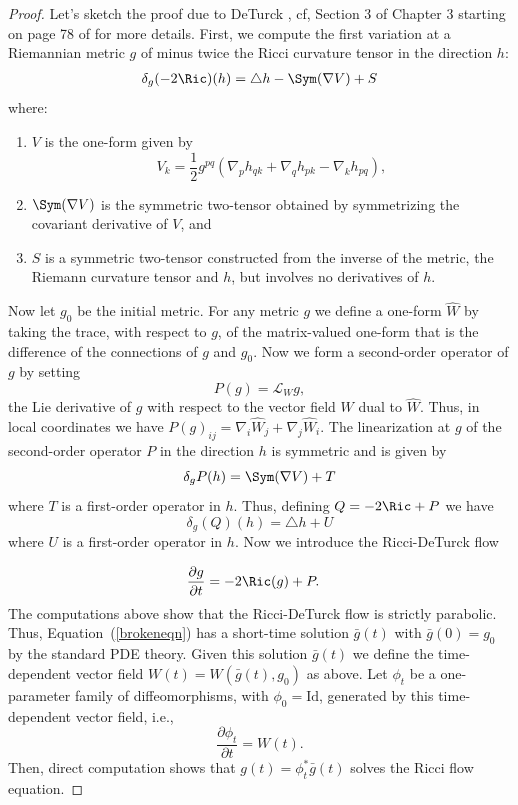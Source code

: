 \begin{proof}
Let's sketch the proof due to DeTurck \cite{DeTurck}, cf, Section
3 of Chapter 3 starting on page 78 of \cite{ChowKnopf} for more details. First, we compute the first variation
at a Riemannian metric $g$ of minus twice the Ricci curvature tensor in the direction $h$:
\begin{align*}
\delta_g(-2\Ric)(h)=\triangle h-\Sym(\nabla V)+S
\end{align*}
where:
\begin{enumerate}
\item $V$ is the one-form given by
$$V_k=\frac{1}{2}g^{pq}(\nabla_ph_{qk}+\nabla_qh_{pk}-\nabla_kh_{pq}),$$
\item $\Sym(\nabla V)$ is the symmetric two-tensor obtained by
symmetrizing the covariant derivative of
$V$, and
\item  $S$ is a symmetric two-tensor constructed from the inverse of the metric,
the Riemann curvature tensor and $h$, but involves no derivatives of $h$.
\end{enumerate}

Now let $g_0$ be the initial metric. For any metric $g$ we define a one-form
$\hat W$ by taking the trace, with respect to $g$, of the matrix-valued
one-form that is the difference of the connections of $g$ and $g_0$. Now we
form a second-order operator of $g$ by setting
$$P(g)={\mathcal L}_Wg,$$
the Lie derivative of $g$ with respect to the vector field $W$ dual to $\hat
W$. Thus, in local coordinates we have
$P(g)_{ij}=\nabla_i\hat W_j+\nabla_j\hat W_i$.
The linearization at $g$ of the second-order operator $P$ in the direction
$h$ is symmetric and is given by
$$\delta_gP(h)=\Sym(\nabla V)+T$$
where $T$ is a first-order operator in $h$.
Thus, defining $Q=-2\Ric+P$ we have
$$\delta_g(Q)(h)=\triangle h+U$$
where $U$ is a first-order operator in $h$.
Now we introduce the Ricci-DeTurck  flow

\begin{align}\label{brokeneqn}
\frac{\partial g}{\partial t}&=-2\Ric(g)+P.
\end{align}
The computations above show that the Ricci-DeTurck flow is  strictly parabolic.
 Thus, Equation~(\ref{brokeneqn})  has a
short-time solution $\bar g(t)$ with $\bar g(0)=g_0$ by the standard PDE theory.
Given this solution $\bar g(t)$ we
define the time-dependent vector field $W(t)=W(\bar g(t),g_0)$ as above.
 Let $\phi_t$ be a one-parameter family of diffeomorphisms, with $\phi_0=\mathrm{Id}$,
generated by this time-dependent vector field, i.e.,
$$\frac{\partial\phi_t}{\partial t}=W(t).$$
Then, direct computation shows that $g(t)=\phi_t^*\bar g(t)$ solves the Ricci flow equation.
\end{proof}



